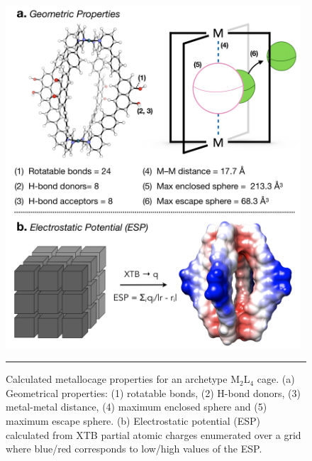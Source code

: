\documentclass[../../main.tex]{subfiles}
\newcommand{\MLf}{M$_2$L$_4$ }
\begin{document}
\begin{figure}[h!]
	\vspace{0.4cm}
	\centering
	\includegraphics[width=11cm]{3/cgbind/figs/fig4}
	\vspace{0.2cm}
	\hrule
	\caption{Calculated metallocage properties for an archetype \MLf cage. (a) Geometrical properties: (1) rotatable bonds, (2) H-bond donors, (3) metal-metal distance, (4) maximum enclosed sphere and (5) maximum escape sphere. (b) Electrostatic potential (ESP) calculated from XTB partial atomic charges enumerated over a grid where blue/red corresponds to low/high values of the ESP.}
	\label{fig::cg_4}
\end{figure}
\clearpage
\end{document}
